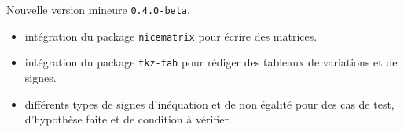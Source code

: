 Nouvelle version mineure \verb+0.4.0-beta+.

\begin{itemize}[itemsep=.5em]
    \item {}
          intégration du package \verb+nicematrix+ pour écrire des matrices.




    \item {}
          intégration du package \verb+tkz-tab+ pour rédiger des tableaux de variations et de signes.




    \item {}
          différents types de signes d'inéquation et de non égalité pour des cas de test, d'hypothèse faite et de condition à vérifier.

\end{itemize}
